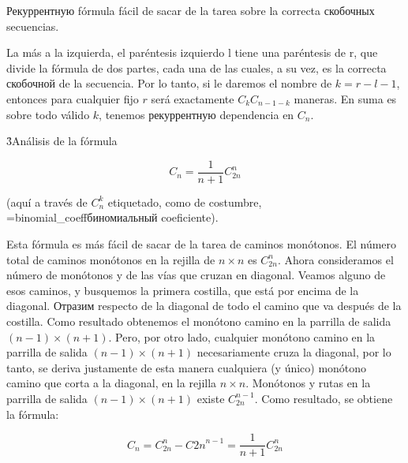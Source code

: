 Рекуррентную fórmula fácil de sacar de la tarea sobre la correcta скобочных secuencias.

La más a la izquierda, el paréntesis izquierdo l tiene una paréntesis de r, que divide la fórmula de dos partes, cada una de las cuales, a su vez, es la correcta скобочной de la secuencia. Por lo tanto, si le daremos el nombre de $k = r-l-1$, entonces para cualquier fijo $r$ será exactamente $C_k C_{n-1-k} $ maneras. En suma es sobre todo válido $k$, tenemos рекуррентную dependencia en $C_n$.

\h3{Análisis de la fórmula}

$$ C_n = \frac{1}{n+1} C_{2n}^{n} $$

(aquí a través de $C_n^k$ etiquetado, como de costumbre, \algohref=binomial_coeff{биномиальный coeficiente}).

Esta fórmula es más fácil de sacar de la tarea de caminos monótonos. El número total de caminos monótonos en la rejilla de $n \times n$ es $C_{2n}^{n}$. Ahora consideramos el número de monótonos y de las vías que cruzan en diagonal. Veamos alguno de esos caminos, y busquemos la primera costilla, que está por encima de la diagonal. Отразим respecto de la diagonal de todo el camino que va después de la costilla. Como resultado obtenemos el monótono camino en la parrilla de salida $(n-1) \times (n+1)$. Pero, por otro lado, cualquier monótono camino en la parrilla de salida $(n-1) \times (n+1)$ necesariamente cruza la diagonal, por lo tanto, se deriva justamente de esta manera cualquiera (y único) monótono camino que corta a la diagonal, en la rejilla $n \times n$. Monótonos y rutas en la parrilla de salida $(n-1) \times (n+1)$ existe $C_{2n}^{n-1}$. Como resultado, se obtiene la fórmula:

$$ C_n = C_{2n}^{n} - C{2n}^{n-1} = \frac{1}{n+1} C_{2n}^{n} $$